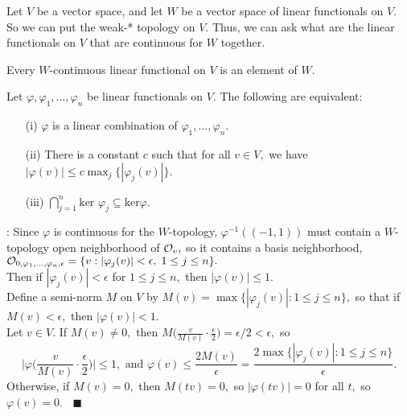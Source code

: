 \noindent Let $V$ be a vector space, and let $W$ be a vector space of linear functionals on $V.$ So we can put the weak-* topology on $V.$ Thus, we can ask what are the linear functionals on $V$ that are continuous for $W$ together.

\begin{prop}
Every $W$-continuous linear functional on $V$ is an element of $W.$
\end{prop}

\begin{lemma}
Let $\varphi,\varphi_1,\hdots,\varphi_n$ be linear functionals on $V.$ The following are equivalent:
\begin{enumerate}
\item[(i)] $\varphi$ is a linear combination of $\varphi_1,\hdots,\varphi_n.$
\item[(ii)] There is a constant $c$ such that for all $v\in V,$ we have $|\varphi(v)|\leq c\max_j\{|\varphi_j(v)|\}.$
\item[(iii)] $\bigcap_{j=1}^n\text{ker }\varphi_j\subseteq\text{ker}\varphi.$
\end{enumerate}
\end{lemma}

\begin{frame*}
\noindent{}: Since $\varphi$ is continuous for the $W$-topology, $\varphi^{-1}((-1,1))$ must contain a $W$-topology open neighborhood of $\mathcal{O}_v,$ so it contains a basis neighborhood, \\ $\mathcal{O}_{0,\varphi_1,\hdots,\varphi_n,\epsilon}=\{v:|\varphi_j(v)|<\epsilon,\;1\leq j\leq n\}.$ \\
Then if $|\varphi_j(v)|<\epsilon$ for $1\leq j\leq n,$ then $|\varphi(v)|\leq 1.$ \\
Define a semi-norm $M$ on $V$ by $M(v)=\max\{|\varphi_j(v)|:1\leq j\leq n\},$ so that if $M(v)<\epsilon,$ then $|\varphi(v)|<1.$ \\
Let $v\in V.$ If $M(v)\neq 0,$ then $M\Big(\frac{v}{M(v)}\cdot\frac{\epsilon}{2}\Big)=\epsilon/2<\epsilon,$ so
$$\Big|\varphi\Big(\frac{v}{M(v)}\cdot\frac{\epsilon}{2}\Big)\Big|\leq 1,\text{ and } \varphi(v)\leq\frac{2M(v)}{\epsilon}=\frac{2\max\{|\varphi_j(v)|:1\leq j\leq n\}}{\epsilon}.$$
Otherwise, if $M(v)=0,$ then $M(tv)=0,$ so $|\varphi(tv)|=0$ for all $t,$ so $\varphi(v)=0.$ $\;\;\blacksquare$
\end{frame*}

